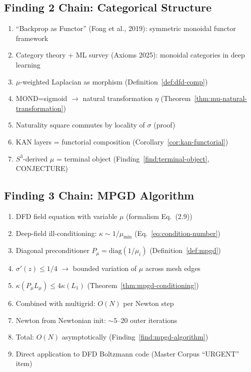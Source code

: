 \documentclass[11pt]{article}
\theoremstyle{definition}
\theoremstyle{remark}
\begin{document}
\subsection{Finding 2 Chain: Categorical Structure}

\begin{enumerate}[nosep]
\item ``Backprop as Functor'' (Fong et al., 2019): symmetric monoidal functor framework
\item Category theory + ML survey (Axioms 2025): monoidal categories in deep learning
\item $\mu$-weighted Laplacian as morphism (Definition~\ref{def:dfd-comp})
\item MOND=sigmoid $\to$ natural transformation $\eta$ (Theorem~\ref{thm:mu-natural-transformation})
\item Naturality square commutes by locality of $\sigma$ (proof)
\item KAN layers = functorial composition (Corollary~\ref{cor:kan-functorial})
\item $S^3$-derived $\mu$ = terminal object (Finding~\ref{find:terminal-object}, CONJECTURE)
\end{enumerate}

\subsection{Finding 3 Chain: MPGD Algorithm}

\begin{enumerate}[nosep]
\item DFD field equation with variable $\mu$ (formalism Eq.~(2.9))
\item Deep-field ill-conditioning: $\kappa \sim 1/\mu_{\min}$ (Eq.~\ref{eq:condition-number})
\item Diagonal preconditioner $P_\mu = \text{diag}(1/\mu_i)$ (Definition~\ref{def:mpgd})
\item $\sigma'(z) \leq 1/4$ $\to$ bounded variation of $\mu$ across mesh edges
\item $\kappa(P_\mu L_\mu) \leq 4\kappa(L_1)$ (Theorem~\ref{thm:mpgd-conditioning})
\item Combined with multigrid: $O(N)$ per Newton step
\item Newton from Newtonian init: $\sim 5$--$20$ outer iterations
\item Total: $O(N)$ asymptotically (Finding~\ref{find:mpgd-algorithm})
\item Direct application to DFD Boltzmann code (Master Corpus ``URGENT'' item)
\end{enumerate}
\end{document}
